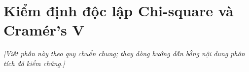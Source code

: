 \section{Kiểm định độc lập Chi-square và Cramér’s V}
\noindent\textit{[Viết phần này theo quy chuẩn chung; thay dòng hướng dẫn bằng nội dung phân tích đã kiểm chứng.]}

